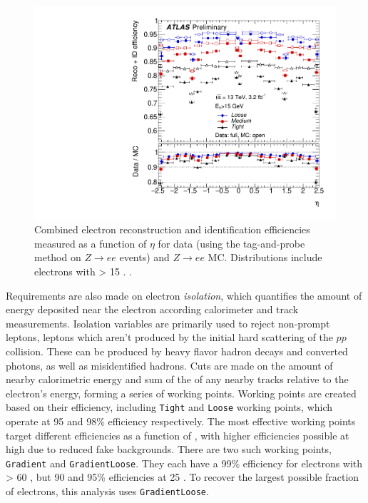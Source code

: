 \begin{centering}
\begin{figure}[!hbt]
\myfloatalign
\includegraphics[width=.90\linewidth]{figures/reco/fig_14b.pdf}
\caption{ Combined electron reconstruction and identification efficiencies measured as a function of $\eta$ for data (using the tag-and-probe method on $Z\rightarrow ee$ events) and $Z\rightarrow ee$ \ac{MC}. Distributions include electrons with \et > 15 \gev. \cite{ATLAS-CONF-2016-024}.}
\label{fig:reco_el_sf}
\end{figure}
\end{centering}

Requirements are also made on electron \textit{isolation}, which quantifies the amount of energy deposited near the electron according calorimeter and track measurements. Isolation variables are primarily used to reject non-prompt leptons, leptons which aren't produced by the initial hard scattering of the $pp$ collision. These can be produced by heavy flavor hadron decays and converted photons, as well as misidentified hadrons. Cuts are made on the amount of nearby calorimetric energy and sum of the \pt of any nearby tracks relative to the electron's energy, forming a series of working points. Working points are created based on their efficiency, including \texttt{Tight} and \texttt{Loose} working points, which operate at 95 and 98\% efficiency respectively. The most effective working points target different efficiencies as a function of \pt, with higher efficiencies possible at high \pt due to reduced fake backgrounds. There are two such working points, \texttt{Gradient} and \texttt{GradientLoose}. They each have a 99\% efficiency for electrons with \pt > 60 \gev, but 90 and 95\% efficiencies at 25 \gev. To recover the largest possible fraction of electrons, this analysis uses \texttt{GradientLoose}.

